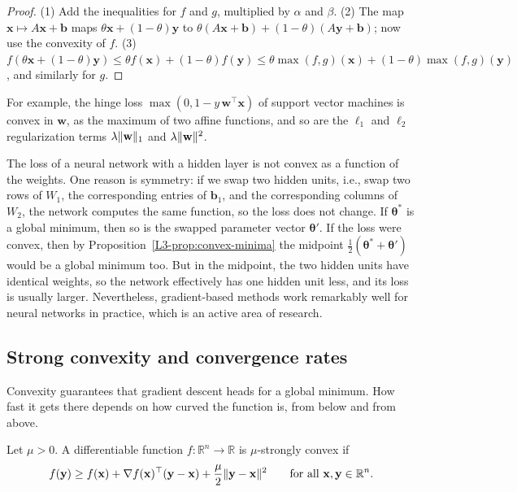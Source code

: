 \begin{proof}
    (1) Add the inequalities for $f$ and $g$, multiplied by $\alpha$ and $\beta$. (2) The map $\mathbf{x} \mapsto A\mathbf{x} + \mathbf{b}$ maps $\theta\mathbf{x} + (1 - \theta)\mathbf{y}$ to $\theta(A\mathbf{x} + \mathbf{b}) + (1 - \theta)(A\mathbf{y} + \mathbf{b})$; now use the convexity of $f$. (3) $f(\theta\mathbf{x} + (1 - \theta)\mathbf{y}) \leq \theta f(\mathbf{x}) + (1 - \theta)f(\mathbf{y}) \leq \theta\max(f, g)(\mathbf{x}) + (1 - \theta)\max(f, g)(\mathbf{y})$, and similarly for $g$.
\end{proof}

For example, the hinge loss $\max(0, 1 - y\,\mathbf{w}^\top\mathbf{x})$ of support vector machines is convex in $\mathbf{w}$, as the maximum of two affine functions, and so are the $\ell_1$ and $\ell_2$ regularization terms $\lambda\lVert \mathbf{w} \rVert_1$ and $\lambda\lVert \mathbf{w} \rVert^2$.

\begin{remark}
    The loss of a neural network with a hidden layer is not convex as a function of the weights. One reason is symmetry: if we swap two hidden units, i.e., swap two rows of $W_1$, the corresponding entries of $\mathbf{b}_1$, and the corresponding columns of $W_2$, the network computes the same function, so the loss does not change. If $\boldsymbol{\theta}^*$ is a global minimum, then so is the swapped parameter vector $\boldsymbol{\theta}'$. If the loss were convex, then by Proposition~\ref{L3-prop:convex-minima} the midpoint $\frac{1}{2}(\boldsymbol{\theta}^* + \boldsymbol{\theta}')$ would be a global minimum too. But in the midpoint, the two hidden units have identical weights, so the network effectively has one hidden unit less, and its loss is usually larger. Nevertheless, gradient-based methods work remarkably well for neural networks in practice, which is an active area of research.
\end{remark}

\subsection{Strong convexity and convergence rates}\label{L3-sec:rates}

Convexity guarantees that gradient descent heads for a global minimum. How fast it gets there depends on how curved the function is, from below and from above.

\begin{definition}\label{L3-def:strongly-convex}
    Let $\mu > 0$. A differentiable function $f: \mathbb{R}^n \to \mathbb{R}$ is $\mu$-strongly convex if
    \[f(\mathbf{y}) \geq f(\mathbf{x}) + \nabla f(\mathbf{x})^\top(\mathbf{y} - \mathbf{x}) + \frac{\mu}{2}\lVert \mathbf{y} - \mathbf{x} \rVert^2 \qquad \text{for all } \mathbf{x}, \mathbf{y} \in \mathbb{R}^n.\]
\end{definition}

